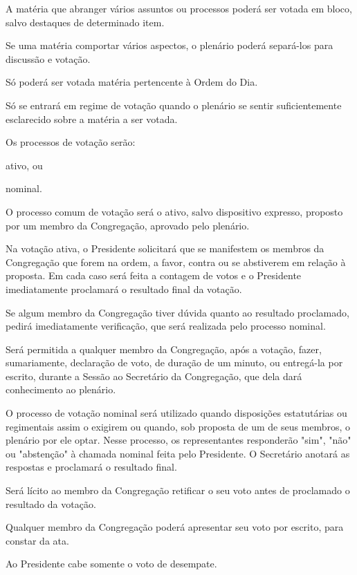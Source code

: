 \documentclass{documento}
\begin{document}
\artigo A matéria que abranger vários assuntos ou processos poderá ser votada em bloco, salvo destaques de determinado item.

\paragrafounico Se uma matéria comportar vários aspectos, o plenário poderá separá-los para discussão e votação.


\artigo Só poderá ser votada matéria pertencente à Ordem do Dia.

\artigo Só se entrará em regime de votação quando o plenário se sentir suficientemente esclarecido sobre a matéria a ser votada.

\artigo Os processos de votação serão:

\inciso ativo, ou

\inciso nominal.

\artigo O processo comum de votação será o ativo, salvo dispositivo expresso, proposto por um membro da Congregação, aprovado pelo plenário.

\paragrafo Na votação ativa, o Presidente solicitará que se manifestem os membros da Congregação que forem na ordem, a favor, contra ou se abstiverem em relação à proposta. Em cada caso será feita a contagem de votos e o Presidente imediatamente proclamará o resultado final da votação.

\paragrafo Se algum membro da Congregação tiver dúvida quanto ao resultado proclamado, pedirá imediatamente verificação, que será realizada pelo processo nominal.

\paragrafo Será permitida a qualquer membro da Congregação, após a votação, fazer, sumariamente, declaração de voto, de duração de um minuto, ou entregá-la por escrito, durante a Sessão ao Secretário da Congregação, que dela dará conhecimento ao plenário.

\artigo O processo de votação nominal será utilizado quando disposições estatutárias ou regimentais assim o exigirem ou quando, sob proposta de um de seus membros, o plenário por ele optar. Nesse processo, os representantes responderão "sim", "não" ou "abstenção" à chamada nominal feita pelo Presidente. O Secretário anotará as respostas e proclamará o resultado final.

\artigo Será lícito ao membro da Congregação retificar o seu voto antes de proclamado o resultado da votação.

\artigo Qualquer membro da Congregação poderá apresentar seu voto por escrito, para constar da ata.

\artigo Ao Presidente cabe somente o voto de desempate.
\end{document}
